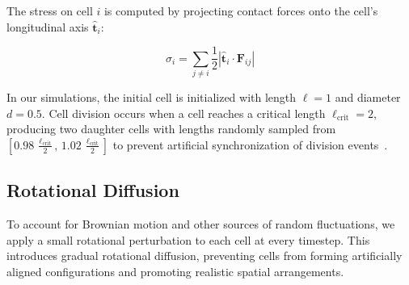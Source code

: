 \documentclass[conference]{IEEEtran}
\begin{document}
The stress on cell $i$ is computed by projecting contact forces onto the cell's longitudinal axis $\hat{\mathbf{t}}_i$:

\begin{equation} \label{eq:stress}
    \sigma_i = \sum_{j \neq i} \frac{1}{2} \left| \hat{\mathbf{t}}_i \cdot \mathbf{F}_{ij} \right|
\end{equation}

In our simulations, the initial cell is initialized with length $\ell = 1$ and diameter $d = 0.5$. Cell division occurs when a cell reaches a critical length $\ell_{\text{crit}} = 2$, producing two daughter cells with lengths randomly sampled from $\left[0.98\,\frac{\ell_{\text{crit}}}{2},\, 1.02\,\frac{\ell_{\text{crit}}}{2}\right]$ to prevent artificial synchronization of division events~\cite{You2018}.

\subsection{Rotational Diffusion}

To account for Brownian motion and other sources of random fluctuations, we apply a small rotational perturbation to each cell at every timestep. This introduces gradual rotational diffusion, preventing cells from forming artificially aligned configurations and promoting realistic spatial arrangements.
\end{document}
